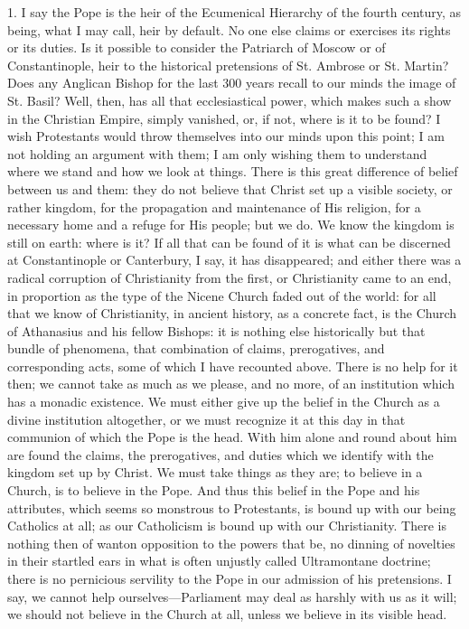 1. I say the Pope is the heir of the Ecumenical Hierarchy of the
fourth century, as being, what I may call, heir by default. No one else
claims or exercises its rights or its duties. Is it possible to consider
the Patriarch of Moscow or of Constantinople, heir to the historical
pretensions of St. Ambrose or St. Martin? Does any Anglican Bishop for
the last 300 years recall to our minds the image of St. Basil? Well,
then, has all that ecclesiastical power, which makes such a show in the
Christian Empire, simply vanished, or, if not, where is it to be found?
I wish Protestants would throw themselves into our minds upon this
point; I am not holding an argument with them; I am only wishing them to
understand where we stand and how we look at things. There is this great
difference of belief between us and them: they do not believe that
Christ set up a visible society, or rather kingdom, for the propagation
and maintenance of His religion, for a necessary home and a refuge for
His people; but we do. We know the kingdom is still on earth: where is
it? If all that can be found of it is what can be discerned at
Constantinople or Canterbury, I say, it has disappeared; and either
there was a radical corruption of Christianity from the first, or
Christianity came to an end, in proportion as the type of the Nicene
Church faded out of the world: for all that we know of Christianity, in
ancient history, as a concrete fact, is the Church of Athanasius and his
fellow Bishops: it is nothing else historically but that bundle of
phenomena, that combination of claims, prerogatives, and corresponding
acts, some of which I have recounted above. There is no help for it
then; we cannot take as much as we please, and no more, of an
institution which has a monadic existence. We must either give up the
belief in the Church as a divine institution altogether, or we must
recognize it at this day in that communion of which the Pope is the
head. With him alone and round about him are found the claims, the
prerogatives, and duties which we identify with the kingdom set up by
Christ. We must take things as they are; to believe in a Church, is to
believe in the Pope. And thus this belief in the Pope and his
attributes, which seems so monstrous to Protestants, is bound up with
our being Catholics at all; as our Catholicism is bound up with our
Christianity. There is nothing then of wanton opposition to the powers
that be, no dinning of novelties in their startled ears in what is often
unjustly called Ultramontane doctrine; there is no pernicious servility
to the Pope in our admission of his pretensions. I say, we cannot help
ourselves—Parliament may deal as harshly with us as it will; we should
not believe in the Church at all, unless we believe in its visible head.


